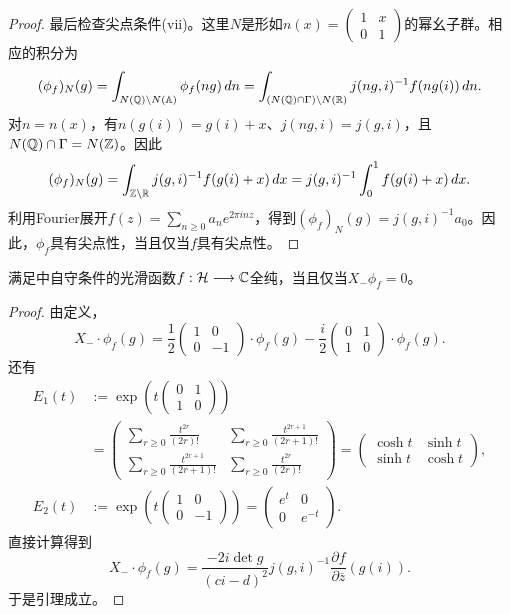 \begin{proof}
最后检查尖点条件(vii)。这里$N$是形如$n(x)=\begin{pmatrix}1&x\\0&1\end{pmatrix}$的幂幺子群。相应的积分为
\[(\phi_f)_N(g)=\int_{N(\mathbb{Q})\backslash N(\mathbb{A})}\phi_f(ng)\,dn=\int_{(N(\mathbb{Q})\cap\Gamma)\backslash N(\mathbb{R})}j(ng,i)^{-1}f(ng(i))\,dn.\]
对$n=n(x)$，有$n(g(i))=g(i)+x$、$j(ng,i)=j(g,i)$，且$N(\mathbb{Q})\cap\Gamma=N(\mathbb{Z})$。因此
\[(\phi_f)_N(g)=\int_{\mathbb{Z}\backslash\mathbb{R}}j(g,i)^{-1}f(g(i)+x)\,dx=j(g,i)^{-1}\int_0^1f(g(i)+x)\,dx.\]
利用Fourier展开$f(z)=\sum_{n\geq0}a_ne^{2\pi inz}$，得到$(\phi_f)_N(g)=j(g,i)^{-1}a_0$。因此，$\phi_f$具有尖点性，当且仅当$f$具有尖点性。
\end{proof}
\begin{lemma}\label{L6S2O3}
满足中自守条件的光滑函数$f:\mathcal H\longrightarrow\mathbb{C}$全纯，当且仅当$X_-\phi_f=0$。
\end{lemma}
\begin{proof}
由定义，
\[X_-\cdot\phi_f(g)=\frac12\begin{pmatrix}1&0\\0&-1\end{pmatrix}\cdot\phi_f(g)-\frac i2\begin{pmatrix}0&1\\1&0\end{pmatrix}\cdot\phi_f(g).\]
还有
\begin{align*}
E_1(t)&:=\exp\!\left(t\begin{pmatrix}0&1\\1&0\end{pmatrix}\right)\\
&=\begin{pmatrix}\displaystyle\sum_{r\geq0}\frac{t^{2r}}{(2r)!}&\displaystyle\sum_{r\geq0}\frac{t^{2r+1}}{(2r+1)!}\\\displaystyle\sum_{r\geq0}\frac{t^{2r+1}}{(2r+1)!}&\displaystyle\sum_{r\geq0}\frac{t^{2r}}{(2r)!}\end{pmatrix}
=\begin{pmatrix}\cosh t&\sinh t\\\sinh t&\cosh t\end{pmatrix},\\
E_2(t)&:=\exp\!\left(t\begin{pmatrix}1&0\\0&-1\end{pmatrix}\right)=\begin{pmatrix}e^t&0\\0&e^{-t}\end{pmatrix}.
\end{align*}
直接计算得到
\[X_-\cdot\phi_f(g)=\frac{-2i\det g}{(ci-d)^2}j(g,i)^{-1}\frac{\partial f}{\partial\overline z}(g(i)).\]
于是引理成立。
\end{proof}
